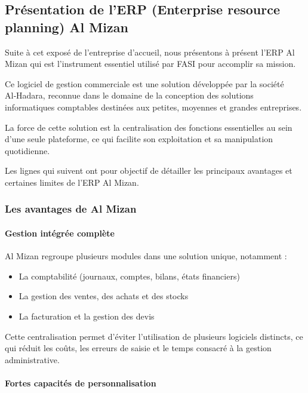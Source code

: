 \documentclass[a4paper,12pt]{report}
\begin{document}
\subsection{Présentation de l'ERP (Enterprise resource planning) Al Mizan}

Suite à cet exposé de l'entreprise d'accueil, nous présentons à présent l'ERP Al Mizan qui est l'instrument essentiel utilisé par FASI pour accomplir sa mission.

Ce logiciel de gestion commerciale est une solution développée par la société Al‑Hadara, reconnue dans le domaine de la conception des solutions informatiques comptables destinées aux petites, moyennes et grandes entreprises.

La force de cette solution est la centralisation des fonctions essentielles au sein d'une seule plateforme, ce qui facilite son exploitation et sa manipulation quotidienne.

Les lignes qui suivent ont pour objectif de détailler les principaux avantages et certaines limites de l'ERP Al Mizan.

\subsubsection{Les avantages de Al Mizan}

\paragraph{Gestion intégrée complète}

Al Mizan regroupe plusieurs modules dans une solution unique, notamment :

\begin{itemize}
\item La comptabilité (journaux, comptes, bilans, états financiers)
\item La gestion des ventes, des achats et des stocks
\item La facturation et la gestion des devis
\end{itemize}

Cette centralisation permet d'éviter l'utilisation de plusieurs logiciels distincts, ce qui réduit les coûts, les erreurs de saisie et le temps consacré à la gestion administrative.

\paragraph{Fortes capacités de personnalisation}
\end{document}
